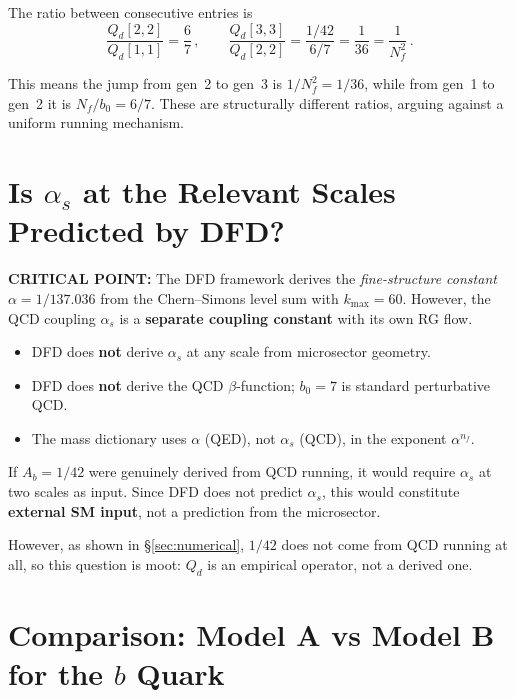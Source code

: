 \documentclass[11pt,a4paper]{article}
\newcommand{\as}{\alpha_s}
\newcommand{\Nf}{N_f}
\theoremstyle{definition}
\theoremstyle{remark}
\begin{document}
The ratio between consecutive entries is
\begin{equation}
\frac{Q_d[2,2]}{Q_d[1,1]} = \frac{6}{7}\,,\qquad
\frac{Q_d[3,3]}{Q_d[2,2]} = \frac{1/42}{6/7} = \frac{1}{36} = \frac{1}{\Nf^2}\,.
\end{equation}

This means the jump from gen~2 to gen~3 is $1/\Nf^2 = 1/36$, while from
gen~1 to gen~2 it is $\Nf/b_0 = 6/7$.  These are structurally different
ratios, arguing against a uniform running mechanism.

\section{Is $\as$ at the Relevant Scales Predicted by DFD?}
\label{sec:external}

\textcolor{warn}{\textbf{CRITICAL POINT:}} The DFD framework derives the
\emph{fine-structure constant} $\alpha = 1/137.036$ from the Chern--Simons
level sum with $k_{\max} = 60$.  However, the QCD coupling $\as$ is a
\textbf{separate coupling constant} with its own RG flow.

\begin{itemize}
\item DFD does \textbf{not} derive $\as$ at any scale from microsector
  geometry.
\item DFD does \textbf{not} derive the QCD $\beta$-function; $b_0 = 7$ is
  standard perturbative QCD.
\item The mass dictionary uses $\alpha$ (QED), not $\as$ (QCD), in the
  exponent $\alpha^{n_f}$.
\end{itemize}

If $A_b = 1/42$ were genuinely derived from QCD running, it would require
$\as$ at two scales as input.  Since DFD does not predict $\as$, this would
constitute \textbf{external SM input}, not a prediction from the microsector.

However, as shown in \S\ref{sec:numerical}, $1/42$ does not come from QCD
running at all, so this question is moot: $Q_d$ is an empirical operator,
not a derived one.

\section{Comparison: Model A vs Model B for the $b$ Quark}
\label{sec:models}
\end{document}
